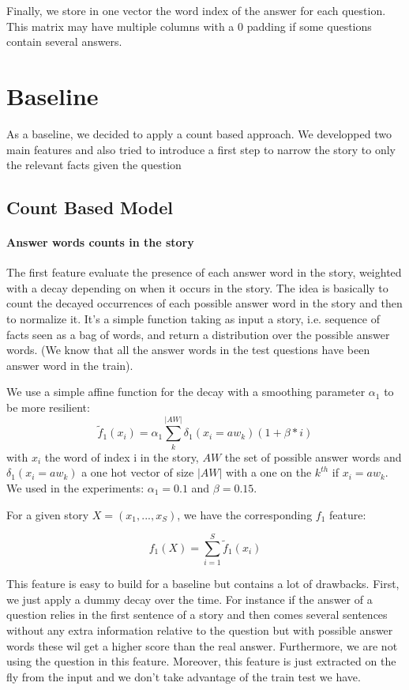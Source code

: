 \documentclass[paper=a4, fontsize=11pt]{scrartcl} %
\numberwithin{equation}{section} %
\numberwithin{figure}{section} %
\numberwithin{table}{section} %
\begin{document}
Finally, we store in one vector the word index of the answer for each question. This matrix may have multiple columns with a 0 padding if some questions contain several answers.


\section*{Baseline}
As a baseline, we decided to apply a count based approach. We developped two main features and also tried to introduce a first step to narrow the story to only the relevant facts given the question

\subsection*{Count Based Model}
\paragraph{Answer words counts in the story}
The first feature evaluate the presence of each answer word in the story, weighted with a decay depending on when it occurs in the story. The idea is basically to count the decayed occurrences of each possible answer word in the story and then to normalize it. It's a simple function taking as input a story, i.e. sequence of facts seen as a bag of words, and return a distribution over the possible answer words. (We know that all the answer words in the test questions have been answer word in the train).


We use a simple affine function for the decay with a smoothing parameter $\alpha_1$ to be more resilient:
\[
\tilde{f}_1(x_i) = \alpha_1 \sum_k^{|AW|}\delta_1(x_i = aw_k)(1 + \beta * i)
\]
with $x_i$ the word of index i in the story, $AW$ the set of possible answer words and $\delta_1(x_i = aw_k)$ a one hot vector of size $|AW|$ with a one on the $k^{th}$ if $x_i = aw_k$. We used in the experiments: $\alpha_1 = 0.1$ and $\beta = 0.15$.


For a given story $X=(x_1, ..., x_S)$, we have the corresponding $f_1$ feature:

\[
f_1(X) = \sum_{i=1}^S\tilde{f}_1(x_i)
\]

This feature is easy to build for a baseline but contains a lot of drawbacks. First, we just apply a dummy decay over the time. For instance if the answer of a question relies in the first sentence of a story and then comes several sentences without any extra information relative to the question but with possible answer words these wil get a higher score than the real answer. Furthermore, we are not using the question in this feature. Moreover, this feature is just extracted on the fly from the input and we don't take advantage of the train test we have. 
\end{document}
